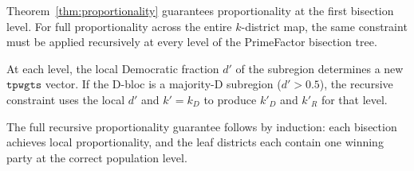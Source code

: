 Theorem~\ref{thm:proportionality} guarantees proportionality at the first
bisection level.
For full proportionality across the entire $k$-district map, the same
constraint must be applied recursively at every level of the PrimeFactor
bisection tree.

At each level, the local Democratic fraction $d'$ of the subregion determines
a new $\mathtt{tpwgts}$ vector.
If the D-bloc is a majority-D subregion ($d' > 0.5$), the recursive constraint
uses the local $d'$ and $k' = k_D$ to produce $k'_D$ and $k'_R$ for that level.

The full recursive proportionality guarantee follows by induction:
each bisection achieves local proportionality, and the leaf districts
each contain one winning party at the correct population level.

